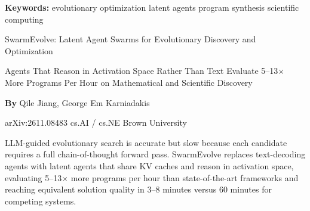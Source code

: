 \documentclass[10pt,twocolumn]{article}
\begin{document}
\setlength{\parindent}{0pt}
\setlength{\parskip}{4pt}

{\small\color{keywordgray}\textbf{Keywords:}
  evolutionary optimization \textbullet{}
  latent agents \textbullet{}
  program synthesis \textbullet{}
  scientific computing}\par\vspace{4pt}

{\LARGE\bfseries\raggedright
  SwarmEvolve: Latent Agent Swarms for Evolutionary Discovery
  and Optimization}\par\vspace{4pt}

{\large\itshape\raggedright
  Agents That Reason in Activation Space Rather Than Text
  Evaluate 5--13$\times$ More Programs Per Hour on Mathematical
  and Scientific Discovery}\par\vspace{6pt}

{\small\textbf{By} Qile Jiang, George Em Karniadakis}\par\vspace{2pt}

{\small\color{keywordgray}arXiv:2611.08483 \textbullet{}
  cs.AI / cs.NE \textbullet{} Brown University}
\par\vspace{2pt}\noindent{\color{rulered}\rule{\columnwidth}{0.6pt}}\vspace{6pt}

LLM-guided evolutionary search is accurate but slow because each
candidate requires a full chain-of-thought forward pass. SwarmEvolve
replaces text-decoding agents with latent agents that share KV caches
and reason in activation space, evaluating 5--13$\times$ more programs
per hour than state-of-the-art frameworks and reaching equivalent
solution quality in 3--8 minutes versus 60 minutes for competing systems.
\end{document}
